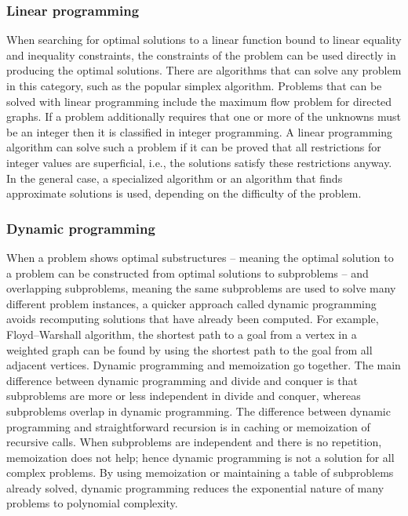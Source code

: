 \documentclass[12pt,a4paper]{book}
\begin{document}
\subsubsection{Linear programming}
When searching for optimal solutions to a linear function bound to linear equality and inequality constraints, the constraints of the problem can be used directly in producing the optimal solutions. There are algorithms that can solve any problem in this category, such as the popular simplex algorithm. Problems that can be solved with linear programming include the maximum flow problem for directed graphs. If a problem additionally requires that one or more of the unknowns must be an integer then it is classified in integer programming. A linear programming algorithm can solve such a problem if it can be proved that all restrictions for integer values are superficial, i.e., the solutions satisfy these restrictions anyway. In the general case, a specialized algorithm or an algorithm that finds approximate solutions is used, depending on the difficulty of the problem.
\subsubsection{Dynamic programming}
When a problem shows optimal substructures – meaning the optimal solution to a problem can be constructed from optimal solutions to subproblems – and overlapping subproblems, meaning the same subproblems are used to solve many different problem instances, a quicker approach called dynamic programming avoids recomputing solutions that have already been computed. For example, Floyd–Warshall algorithm, the shortest path to a goal from a vertex in a weighted graph can be found by using the shortest path to the goal from all adjacent vertices. Dynamic programming and memoization go together. The main difference between dynamic programming and divide and conquer is that subproblems are more or less independent in divide and conquer, whereas subproblems overlap in dynamic programming. The difference between dynamic programming and straightforward recursion is in caching or memoization of recursive calls. When subproblems are independent and there is no repetition, memoization does not help; hence dynamic programming is not a solution for all complex problems. By using memoization or maintaining a table of subproblems already solved, dynamic programming reduces the exponential nature of many problems to polynomial complexity.
\end{document}
